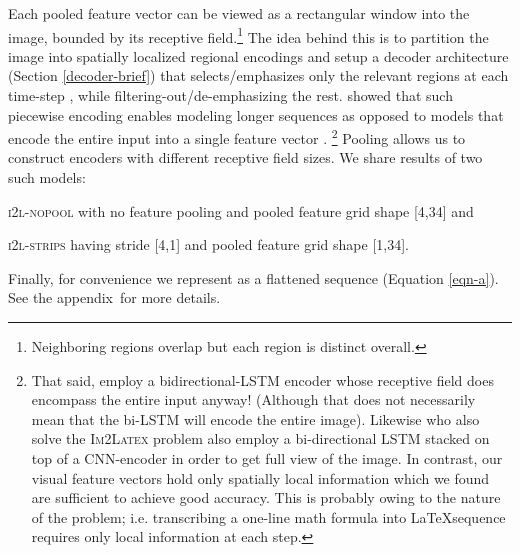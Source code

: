 \documentclass{article}
\newcommand{\suppmat}{appendix}
\begin{document}
Each pooled feature vector can be viewed as a rectangular window into the image, bounded by its receptive field.\footnote{Neighboring regions overlap but each region is distinct overall.} The idea behind this is to partition the image into spatially localized regional encodings and setup a decoder architecture (Section \ref{decoder-brief}) that selects/emphasizes only the relevant regions at each time-step , while filtering-out/de-emphasizing the rest. \citealt{Bahdanau2014NeuralMT} showed that such piecewise encoding enables modeling longer sequences as opposed to models that encode the entire input into a single feature vector \cite{Sutskever2014SequenceTS, Cho2014LearningPR}.
\footnote{That said, \citealt{Bahdanau2014NeuralMT} employ a bidirectional-LSTM \cite{Graves2008SupervisedSL} encoder whose receptive field does encompass the entire input anyway! ({Although that does not necessarily mean that the bi-LSTM will encode the entire image}). Likewise \citealt{Deng2017ImagetoMarkupGW} who also solve the \textsc{Im2Latex} problem also employ a bi-directional LSTM stacked on top of a CNN-encoder in order to get full view of the image. In contrast, our visual feature vectors hold only spatially local information which we found are sufficient to achieve good accuracy. This is probably owing to the nature of the problem; i.e. transcribing a one-line math formula into \LaTeX sequence requires only local information at each step.}
Pooling allows us to construct encoders with different receptive field sizes. We share results of two such models:
\begin{itemize*}
	\item[\textsc{i2l-nopool}] with no feature pooling and pooled feature grid shape [4,34] and 
	\item[\textsc{i2l-strips}] having stride [4,1] and pooled feature grid shape [1,34].
\end{itemize*}	
Finally, for convenience we represent  as a flattened sequence  (Equation \ref{eqn-a}). See the \suppmat ~for more details.


\endgroup
\end{document}
